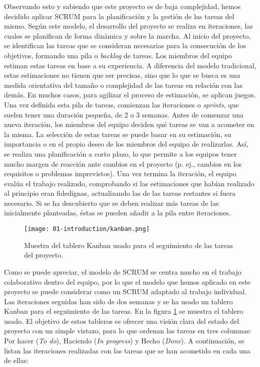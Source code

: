 Observando esto y sabiendo que este proyecto es de baja complejidad, hemos
decidido aplicar SCRUM para la planificación y la gestión de las tareas del
mismo. Según este modelo, el desarrollo del proyecto se realiza en iteraciones,
las cuales se planifican de forma dinámica y sobre la marcha. Al inicio del
proyecto, se identifican las tareas que se consideran necesarias para la
consecución de los objetivos, formando una pila o \textit{backlog} de tareas.
Los miembros del equipo estiman estas tareas en base a su experiencia. A
diferencia del modelo tradicional, estas estimaciones no tienen que ser
precisas, sino que lo que se busca es una medida orientativa del tamaño o
complejidad de las tareas en relación con las demás. En muchos casos, para
agilizar el proceso de estimación, se aplican juegos. Una vez definida esta pila
de tareas, comienzan las iteraciones o \textit{sprints}, que suelen tener una
duración pequeña, de 2 o 3 semanas. Antes de comenzar una nueva iteración, los
miembros del equipo deciden qué tareas se van a acometer en la misma. La
selección de estas tareas se puede basar en su estimación, su importancia o en
el propio deseo de los miembros del equipo de realizarlas. Así, se realiza una
planificación a corto plazo, lo que permite a los equipos tener mucho margen de
reacción ante cambios en el proyecto (p. ej., cambios en los requisitos o
problemas imprevistos). Una vez termina la iteración, el equipo evalúa el
trabajo realizado, comprobando si las estimaciones que habían realizado al
principio eran fidedignas, actualizando las de las tareas restantes si fuera
necesario. Si se ha descubierto que se deben realizar más tareas de las
inicialmente planteadas, éstas se pueden añadir a la pila entre iteraciones.

\begin{figure}
      \centering
      \texttt{[image: 01-introduction/kanban.png]}
      \caption{Muestra del tablero Kanban usado para el seguimiento de las tareas del proyecto.}
      \label{fig:01-kanban}
\end{figure}

Como se puede apreciar, el modelo de SCRUM se centra mucho en el trabajo
colaborativo dentro del equipo, por lo que el modelo que hemos aplicado en este
proyecto se puede considerar como un SCRUM adaptado al trabajo individual. Las
iteraciones seguidas han sido de dos semanas y se ha usado un tablero Kanban
para el seguimiento de las tareas. En la figura \ref{fig:01-kanban} se muestra
el tablero usado. El objetivo de estos tableros es ofrecer una visión clara del
estado del proyecto con un simple vistazo, para lo que ordenan las tareas en
tres columnas: Por hacer (\textit{To do}), Haciendo (\textit{In progress}) y
Hecho (\textit{Done}). A continuación, se listan las iteraciones realizadas con
las tareas que se han acometido en cada una de ellas:


